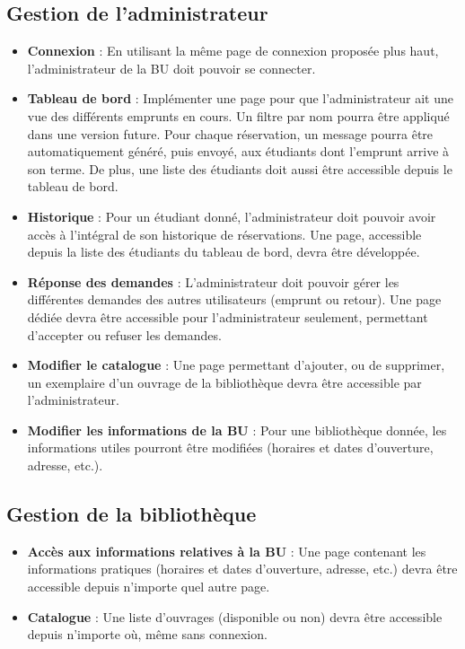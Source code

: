 \documentclass{article}%
\begin{document}
\subsection{Gestion de l'administrateur}
\begin{itemize}
    \item \textbf{Connexion} : En utilisant la même page de connexion proposée plus haut, l'administrateur de la BU doit pouvoir se connecter. 
    \item \textbf{Tableau de bord} : Implémenter une page pour que l'administrateur ait une vue des différents emprunts en cours. Un filtre par nom pourra être appliqué dans une version future. Pour chaque réservation, un message pourra être automatiquement généré, puis envoyé, aux étudiants dont l'emprunt arrive à son terme. De plus, une liste des étudiants doit aussi être accessible depuis le tableau de bord.
    \item \textbf{Historique} : Pour un étudiant donné, l'administrateur doit pouvoir avoir accès à l'intégral de son historique de réservations. Une page, accessible depuis la liste des étudiants du tableau de bord, devra être développée.
    \item \textbf{Réponse des demandes} : L'administrateur doit pouvoir gérer les différentes demandes des autres utilisateurs (emprunt ou retour). Une page dédiée devra être accessible pour l'administrateur seulement, permettant d'accepter ou refuser les demandes.
    \item \textbf{Modifier le catalogue} : Une page permettant d'ajouter, ou de supprimer, un exemplaire d'un ouvrage de la bibliothèque devra être accessible par l'administrateur.
    \item \textbf{Modifier les informations de la BU} : Pour une bibliothèque donnée, les informations utiles pourront être modifiées (horaires et dates d'ouverture, adresse, etc.).
\end{itemize}

\subsection{Gestion de la bibliothèque}
\begin{itemize}
    \item \textbf{Accès aux informations relatives à la BU} : Une page contenant les informations pratiques (horaires et dates d'ouverture, adresse, etc.) devra être accessible depuis n'importe quel autre page. 
    \item \textbf{Catalogue} : Une liste d'ouvrages (disponible ou non) devra être accessible depuis n'importe où, même sans connexion.
\end{itemize}
\end{document}
